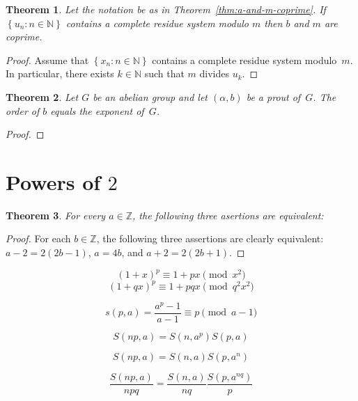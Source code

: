 \documentclass[12pt]{article}
\newcommand{\bZ}{\mathbb{Z}}
\newcommand{\bN}{\mathbb{N}} %
\newtheorem{theorem}{Theorem}
\theoremstyle{definition}
\begin{document}
 \begin{theorem} \label{thm:b-and-m-coprime}
   Let the notation be as in Theorem~\ref{thm:a-and-m-coprime}.
   If $\left\{ u_n : n \in \bN \right\}$ contains a complete residue system modulo $m$ then $b$ and $m$ are coprime.
 \end{theorem} 

 \begin{proof}
 

    Assume that  $\left\{ x_n : n \in \bN \right\}$ contains a complete residue system modulo~$m$.
    In particular, there  exists $k \in \bN$ such that $m$ divides $u_k$.
    \end{proof}
  
 \begin{theorem} \label{thm:order-exponent}
   Let $G$ be an abelian group and let $(\alpha, b)$ be a prout of~$G$.
   The order of $b$ equals the exponent of~$G$.
 \end{theorem}

 \begin{proof}

 \end{proof}

 \section{Powers of $2$}
   



 \begin{theorem} \label{thm:4-in-the-middle}
   For every $a \in \bZ$, the following three asertions are equivalent:
 \end{theorem}

 \begin{proof}
   For each $b \in \bZ$, the following three assertions are clearly equivalent:
   $a - 2 = 2 (2b - 1)$,
   $a = 4 b$, and
   $a + 2 = 2 (2b + 1)$.
 \end{proof}


$$
{(1 + x)}^p \equiv 1 + p x \pmod {x^2}
$$
$$
{(1 + q x)}^p \equiv 1 + p q  x  \pmod{q^2 x^2}
$$

$$
s(p, a)
= \frac{a^p - 1}{a - 1}
\equiv p \pmod{a - 1}
$$



$$
S(np, a) = S(n, a^p) S(p, a)
$$

$$
S(np, a) = S(n, a) S(p, a^n) 
$$

$$
\frac{S(np, a)}{npq}  = \frac{S(n, a)}{nq} \frac{S(p, a^{nq})}{p} 
$$
\end{document}
